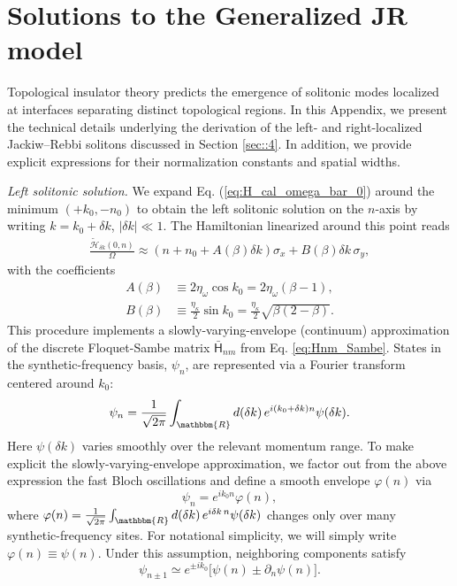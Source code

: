 \documentclass[a4paper,twocolumn,floatfix,10pt,superscriptaddress]%
{quantumarticle}
\newcommand{\mcl}[1]{\mathcal{#1}}
\begin{document}
\section{Solutions to the Generalized JR model}\label{App:JRmodel}
Topological insulator theory predicts the emergence of solitonic modes localized at interfaces separating distinct topological regions. In this Appendix, we present the technical details underlying the derivation of the left- and right-localized Jackiw–Rebbi solitons discussed in Section \ref{sec::4}. In addition, we provide explicit expressions for their normalization constants and spatial widths.

\emph{Left solitonic solution.}
We expand Eq. (\ref{eq:H_cal_omega_bar_0}) around the minimum $(+k_0,-n_0)$ to obtain the left solitonic solution on the $n$-axis by writing $k=k_0+\delta k$, $|\delta k|\ll1$. The Hamiltonian linearized around this point reads
\begin{align}
\frac{\tilde{\mcl{H}}_{\delta k}(0,n)}{\Omega}\approx(n+n_0 + A(\beta)\delta k)\sigma_x
+B(\beta)\delta k\,\sigma_y,
\end{align} 
with the coefficients 
\begin{align}
A(\beta)&\equiv2\eta_\omega\cos k_0=2\eta_\omega(\beta-1),\\
B(\beta)&\equiv\frac{\eta_\kappa}{2}\sin k_0=\frac{\eta_\kappa}{2}\sqrt{\beta(2-\beta)}.
\end{align}
This procedure implements a slowly-varying-envelope (continuum) approximation of the discrete Floquet-Sambe matrix $\bar{\mathsf{H}}_{n m}$ from Eq. \eqref{eq:Hnm_Sambe}. States in the synthetic-frequency basis, $\psi_n$, are represented via a Fourier transform centered around $k_0$:
\begin{align}
    \psi_n=\frac{1}{\sqrt{2\pi}}\int_{\mathbbm{R}} d(\delta k)\,e^{i(k_0+\delta k)n}\psi(\delta k).
\end{align}
Here $\psi(\delta k)$ varies smoothly over the relevant momentum range. To make explicit the slowly-varying-envelope approximation, we factor out from the above expression the fast Bloch oscillations and define a smooth envelope $\varphi(n)$ via
\begin{equation}
\psi_n = e^{ik_0 n} \varphi(n),
\end{equation}
where $\varphi(n)=\frac{1}{\sqrt{2\pi}}\int_{\mathbbm{R}} d(\delta k)\,e^{i\delta k\,n}\psi(\delta k)$ changes only over many synthetic-frequency sites. For notational simplicity, we will simply write $\varphi(n)\equiv \psi(n)$. Under this assumption, neighboring components satisfy
\begin{equation}
\psi_{n\pm1} \simeq e^{\pm ik_0}\big[\psi(n) \pm \partial_n \psi(n)\big].
\end{equation}
\end{document}
